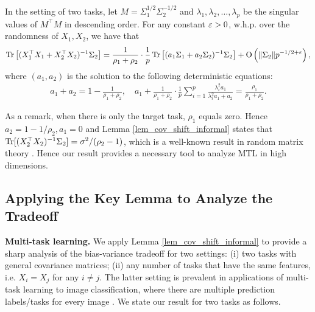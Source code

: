 \begin{lemma}\label{lem_cov_shift_informal}
	In the setting of two tasks, let $M = \Sigma_1^{1/2}\Sigma_2^{-1/2}$ and $\lambda_1, \lambda_2, \dots, \lambda_p$ be the singular values of $M^{\top}M$ in descending order.
	For any constant ${\varepsilon}>0$, w.h.p. over the randomness of $X_1, X_2$, we have that
	\begin{align*}
		\operatorname{Tr}\left[(X_1^{\top}X_1 + X_2^{\top}X_2)^{-1}\Sigma_2\right] = \frac{1}{\rho_1+\rho_2}\cdot \frac1p\operatorname{Tr}\left[ (a_1 \Sigma_1 + a_2\Sigma_2)^{-1} \Sigma_2\right] +\operatorname{O}\left(\|\Sigma_2\| p^{-1/2+\varepsilon}\right),
	\end{align*}
where $(a_1, a_2)$ is the solution to the following deterministic equations:
	\begin{align*}
		a_1 + a_2 = 1- \frac{1}{\rho_1 + \rho_2},\quad a_1 + \frac1{\rho_1 + \rho_2}\cdot \frac{1}{p}\sum_{i=1}^p \frac{\lambda_i^2 a_1}{\lambda_i^2 a_1 + a_2} = \frac{\rho_1}{\rho_1 + \rho_2}.
	\end{align*}
\end{lemma}

As a remark, when there is only the target task, $\rho_1$ equals zero.
Hence $a_2 = 1 - 1/ \rho_2, a_1 = 0$ and Lemma \ref{lem_cov_shift_informal} states that $\operatorname{Tr}[(X_2^{\top}X_2)^{-1}\Sigma_2] = \sigma^2 / (\rho_2 - 1)$, which is a well-known result in random matrix theory \cite{S07}.
Hence our result provides a necessary tool to analyze MTL in high dimensions.

\subsection{Applying the Key Lemma to Analyze the Tradeoff}

\textbf{Multi-task learning.}
We apply Lemma \ref{lem_cov_shift_informal} to provide a sharp analysis of the bias-variance tradeoff for two settings:
(i) two tasks with general covariance matrices;
(ii) any number of tasks that have the same features, i.e. $X_i = X_j$ for any $i\neq j$.
The latter setting is prevalent in applications of multi-task learning to image classification, where there are multiple prediction labels/tasks for every image \cite{chexnet17,EA20}.
We state our result for two tasks as follows.

